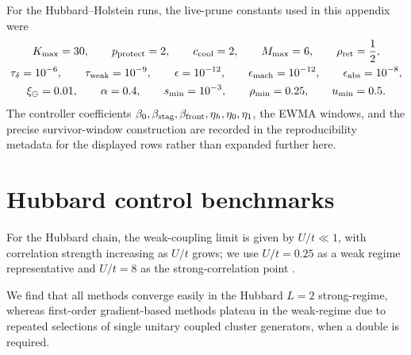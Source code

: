 \documentclass[
  reprint,
  amsmath,
  amssymb,
  aps,
  pra,
  nofootinbib,
  superscriptaddress,
  floatfix
]{revtex4-2}
\begin{document}
For the Hubbard--Holstein runs, the live-prune constants used in this appendix were
\[
\begin{gathered}
K_{\max}=30,\qquad
p_{\rm protect}=2,\qquad
c_{\rm cool}=2,\qquad
M_{\max}=6,\qquad
\rho_{\rm ret}=\frac12,
\\
\tau_\delta=10^{-6},\qquad
\tau_{\rm weak}=10^{-9},\qquad
\epsilon=10^{-12},\qquad
\epsilon_{\rm mach}=10^{-12},\qquad
\epsilon_{\rm abs}=10^{-8},
\\
\xi_\ominus=0.01,\qquad
\alpha=0.4,\qquad
s_{\min}=10^{-3},\qquad
\rho_{\min}=0.25,\qquad
u_{\min}=0.5 .
\end{gathered}
\]
The controller coefficients \(\beta_0,\beta_{\rm stag},\beta_{\rm front},\eta_h,\eta_0,\eta_1\), the EWMA windows, and the precise survivor-window construction are recorded in the reproducibility metadata for the displayed rows rather than expanded further here.

\fi

\section{Hubbard control benchmarks}

For the Hubbard chain, the weak-coupling limit is given by
\(U/t\ll 1\), with correlation strength increasing as \(U/t\) grows;
we use \(U/t=0.25\) as a weak regime representative and \(U/t=8\) as the strong-correlation point
\cite{Arovas2022Hubbard}.  

We find that all methods converge easily in the Hubbard $L=2$ strong-regime, whereas first-order gradient-based methods plateau in the weak-regime due to repeated selections of single unitary coupled cluster generators, when a double is required. 
\end{document}
